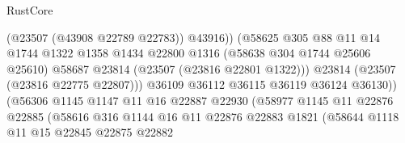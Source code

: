 \begin{lexlean}{RustCore}
\begin{coremodule}
                                              (@23507 (@43908 @22789 @22783))
                                              @43916))
                                          (@58625
                                            @305
                                            @88
                                            @11
                                            @14
                                            @1744
                                            @1322
                                            @1358
                                            @1434
                                            @22800
                                            @1316
                                            (@58638 @304 @1744 @25606 @25610)
                                            @58687
                                            @23814
                                            (@23507 (@23816 @22801 @1322)))
                                          @23814
                                          (@23507 (@23816 @22775 @22807)))
                                        @36109
                                        @36112
                                        @36115
                                        @36119
                                        @36124
                                        @36130))
                                    (@56306
                                      @1145
                                      @1147
                                      @11
                                      @16
                                      @22887
                                      @22930
                                      (@58977
                                        @1145
                                        @11
                                        @22876
                                        @22885
                                        (@58616
                                          @316
                                          @1144
                                          @16
                                          @11
                                          @22876
                                          @22883
                                          @1821
                                          (@58644
                                            @1118
                                            @11
                                            @15
                                            @22845
                                            @22875
                                            @22882

\end{coremodule}
\end{lexlean}
